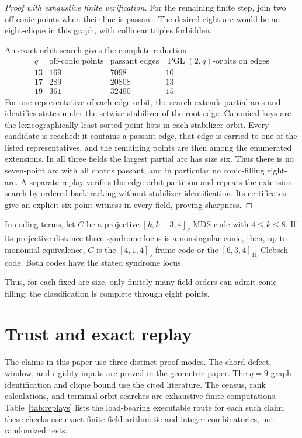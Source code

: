 \documentclass[11pt]{article}
\theoremstyle{remark}
\begin{document}
\begin{proof}[Proof with exhaustive finite verification]
For the remaining finite step, join two off-conic points when their line is
passant. The desired eight-arc would be an eight-clique in this graph, with
collinear triples forbidden.

An exact orbit search gives the complete reduction
\[
\begin{array}{c|c|c|c}
q&\text{off-conic points}&\text{passant edges}&
 \operatorname{PGL}(2,q)\text{-orbits on edges}\\ \hline
13&169&7098&10\\
17&289&20808&13\\
19&361&32490&15.
\end{array}
\]
For one representative of each edge orbit, the search extends partial arcs
and identifies states under the setwise stabilizer of the root edge.
Canonical keys are the lexicographically least sorted point lists in each
stabilizer orbit. Every candidate is reached: it contains a passant edge,
that edge is carried to one of the listed representatives, and the remaining
points are then among the enumerated extensions. In all three fields the
largest partial arc has size six. Thus there is no seven-point arc with all
chords passant, and in particular no conic-filling eight-arc. A separate
replay verifies the edge-orbit partition and repeats the extension search by
ordered backtracking without stabilizer identification. Its certificates
give an explicit six-point witness in every field, proving sharpness.
\end{proof}

In coding terms, let $C$ be a projective $[k,k-3,4]_q$ MDS code with
$4\le k\le8$. If its projective distance-three syndrome locus is a
nonsingular conic, then, up to monomial equivalence, $C$ is the
$[4,1,4]_5$ frame code or the $[6,3,4]_{11}$ Clebsch code. Both codes have
the stated syndrome locus.

Thus, for each fixed arc size, only finitely many field orders can admit
conic filling; the classification is complete through eight points.

\section{Trust and exact replay}
\label{sec:verification}

The claims in this paper use three distinct proof modes.  The chord-defect,
window, and rigidity inputs are proved in the geometric paper.  The
$q=9$ graph identification and clique bound use the cited literature.
The census, rank calculations, and terminal orbit searches are exhaustive
finite computations.  Table~\ref{tab:replays} lists the load-bearing
executable route for each such claim; these checks use exact finite-field
arithmetic and integer combinatorics, not randomized tests.
\end{document}
